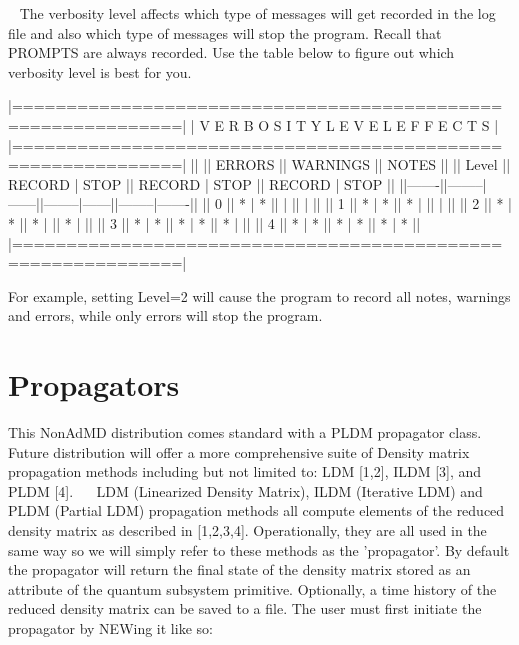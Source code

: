 ~\newline
The verbosity level affects which type of messages will get recorded in the log file and also which type of messages will stop the program. Recall that P\+R\+O\+M\+P\+T\+S are always recorded. Use the table below to figure out which verbosity level is best for you.~\newline
~\newline
\begin{DoxyVerb}|=============================================================|
|         V E R B O S I T Y   L E V E L   E F F E C T S       |
|=============================================================|
||       ||     ERRORS    ||     WARNINGS  ||      NOTES     ||
|| Level || RECORD | STOP || RECORD | STOP || RECORD | STOP  ||
||-------||--------|------||--------|------||--------|-------||
||   0   ||   *    |  *   ||        |      ||        |       ||
||   1   ||   *    |  *   ||   *    |      ||        |       ||
||   2   ||   *    |  *   ||   *    |      ||   *    |       ||
||   3   ||   *    |  *   ||   *    |  *   ||   *    |       ||
||   4   ||   *    |  *   ||   *    |  *   ||   *    |   *   ||
|=============================================================|
\end{DoxyVerb}
 For example, setting Level=2 will cause the program to record all notes, warnings and errors, while only errors will stop the program.~\newline
\hypertarget{_interface_Propagators}{}\section{Propagators}\label{_interface_Propagators}
This Non\+Ad\+M\+D distribution comes standard with a P\+L\+D\+M propagator class. Future distribution will offer a more comprehensive suite of Density matrix propagation methods including but not limited to\+: L\+D\+M \mbox{[}1,2\mbox{]}, I\+L\+D\+M \mbox{[}3\mbox{]}, and P\+L\+D\+M \mbox{[}4\mbox{]}.~\newline
~\newline
L\+D\+M (Linearized Density Matrix), I\+L\+D\+M (Iterative L\+D\+M) and P\+L\+D\+M (Partial L\+D\+M) propagation methods all compute elements of the reduced density matrix as described in \mbox{[}1,2,3,4\mbox{]}. Operationally, they are all used in the same way so we will simply refer to these methods as the 'propagator'. By default the propagator will return the final state of the density matrix stored as an attribute of the quantum subsystem primitive. Optionally, a time history of the reduced density matrix can be saved to a file. The user must first initiate the propagator by N\+E\+Wing it like so\+:~\newline
